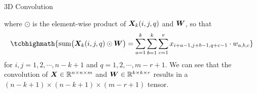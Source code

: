 \begin{frame}{3D Convolution}

\noindent where $\odot$ is the
element-wise product of ${\boldsymbol X}_k(i,j,q)$ and ${\boldsymbol W}$, so that
\begin{align}
    \tcbhighmath{
    \summ\bigl(\bX_k(i,j,q) \odot \bW\bigr) = \sum_{a=1}^k \sum_{b=1}^k \sum_{c=1}^r
x_{i+a-1, j+b-1, q+c-1} \cdot w_{a, b, c} }
\end{align}
for $i, j = 1,2,\cdots,n-k+1$ and $q = 1,2,\cdots,m-r+1$.
We can see that the convolution of ${\boldsymbol X} \in {\mathord{\mathbb R}}^{n\times n \times
m}$ and
${\boldsymbol W} \in {\mathord{\mathbb R}}^{k \times k \times r}$ results in a $(n-k+1) \times
(n-k+1) \times (m-r+1)$ tensor.
\end{frame}

